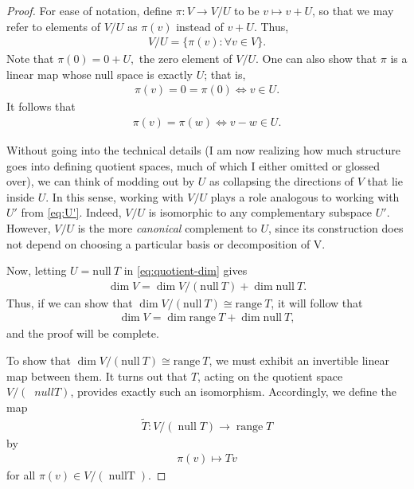 \documentclass{article}
\numberwithin{equation}{section}
\begin{document}
\begin{proof}
For ease of notation, define $\pi: V \to V/U$ to be $v \mapsto v + U$, so that we may refer to elements of $V/U$ as $\pi(v)$ instead of $v + U$. Thus,
\begin{align*}
V/U = \{\pi(v): \forall v\in V \}.
\end{align*}
Note that $\pi(0)=0 + U,$ the zero element of $V/U$. One can also show that $\pi$ is a linear map whose null space is exactly $U$; that is, 
\begin{align*}
\pi(v) = 0 = \pi(0) \iff v \in U.
\end{align*}
It follows that
\begin{align}
\label{eq:pi-equality}
\pi(v)=\pi(w) \iff v-w \in U.
\end{align}

Without going into the technical details (I am now realizing how much structure goes into defining quotient spaces, much of which I either omitted or glossed over), we can think of modding out by $U$ as collapsing the directions of $V$ that lie inside $U$. In this sense, working with $V/U$ plays a role analogous to working with $U'$ from \ref{eq:U'}. Indeed, $V/U$ is isomorphic to any complementary subspace $U'$. However, $V/U$ is the more \textit{canonical} complement to $U$, since its construction does not depend on choosing a particular basis or decomposition of 
V.

Now, letting $U = \mathrm{null}\ T$ in \ref{eq:quotient-dim} gives
\begin{align*}
\dim V = \dim V/(\mathrm{null}\ T) + \dim \mathrm{null}\ T.
\end{align*}
Thus, if we can show that $\dim V/(\mathrm{null}\ T) \cong \mathrm{range}\ T$, it will follow that
\begin{align}
\label{eq:rank-nullity}
\dim V = \dim \mathrm{range}\ T + \dim \mathrm{null}\ T,
\end{align}
and the proof will be complete.

To show that $\dim V/(\mathrm{null}\ T) \cong \mathrm{range}\ T$, we must exhibit an invertible linear map between them. It turns out that $T$, acting on the quotient space $V/(\operatorname{}{null }T)$, provides exactly such an isomorphism. Accordingly, we define the map
\begin{align*}
\widetilde{T}: V/(\operatorname {null }T) \to \operatorname{range }T
\end{align*} by
\begin{align*}
\pi(v)\mapsto Tv
\end{align*}
for all $\pi(v) \in V/(\operatorname{null T}).$


\end{proof}
\end{document}
